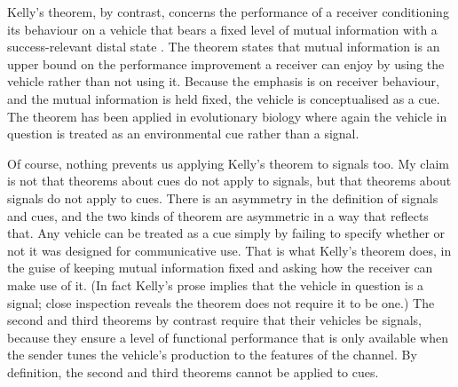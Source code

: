 \documentclass[12pt]{article}
\begin{document}
Kelly's theorem, by contrast, concerns the performance of a receiver conditioning its behaviour on a vehicle that bears a fixed level of mutual information with a success-relevant distal state \citep{kelly1956new}.
The theorem states that mutual information is an upper bound on the performance improvement a receiver can enjoy by using the vehicle rather than not using it.
Because the emphasis is on receiver behaviour, and the mutual information is held fixed, the vehicle is conceptualised as a cue.
The theorem has been applied in evolutionary biology \citep{donaldson-matasci2010fitness} where again the vehicle in question is treated as an environmental cue rather than a signal.

Of course, nothing prevents us applying Kelly's theorem to signals too.
My claim is not that theorems about cues do not apply to signals, but that theorems about signals do not apply to cues.
There is an asymmetry in the definition of signals and cues, and the two kinds of theorem are asymmetric in a way that reflects that.
Any vehicle can be treated as a cue simply by failing to specify whether or not it was designed for communicative use.
That is what Kelly's theorem does, in the guise of keeping mutual information fixed and asking how the receiver can make use of it.
(In fact Kelly's prose implies that the vehicle in question is a signal; close inspection reveals the theorem does not require it to be one.)
The second and third theorems by contrast require that their vehicles be signals, because they ensure a level of functional performance that is only available when the sender tunes the vehicle's production to the features of the channel.
By definition, the second and third theorems cannot be applied to cues.
\end{document}
